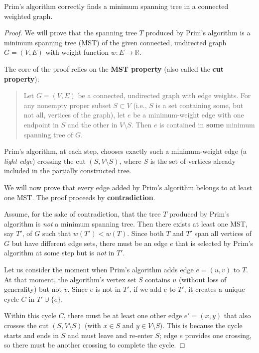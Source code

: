 \begin{theorem}
Prim's algorithm correctly finds a minimum spanning tree in a connected weighted graph.
\end{theorem}

\begin{proof}
We will prove that the spanning tree $T$ produced by Prim's algorithm is a minimum spanning tree (MST) of the given connected, undirected graph $G=(V,E)$ with weight function $w: E \rightarrow \mathbb{R}$.

The core of the proof relies on the \textbf{MST property} (also called the \textbf{cut property}):
\begin{quote}
Let $G=(V,E)$ be a connected, undirected graph with edge weights. For any nonempty proper subset $S \subset V$ (i.e., $S$ is a set containing some, but not all, vertices of the graph), let $e$ be a minimum-weight edge with one endpoint in $S$ and the other in $V \setminus S$. Then $e$ is contained in \textbf{some} minimum spanning tree of $G$.
\end{quote}
Prim's algorithm, at each step, chooses exactly such a minimum-weight edge (a \emph{light edge}) crossing the cut $(S, V \setminus S)$, where $S$ is the set of vertices already included in the partially constructed tree.

We will now prove that every edge added by Prim's algorithm belongs to at least one MST. The proof proceeds by \textbf{contradiction}.

Assume, for the sake of contradiction, that the tree $T$ produced by Prim's algorithm is \emph{not} a minimum spanning tree. Then there exists at least one MST, say $T'$, of $G$ such that $w(T') < w(T)$. Since both $T$ and $T'$ span all vertices of $G$ but have different edge sets, there must be an edge $e$ that is selected by Prim's algorithm at some step but is \emph{not} in $T'$.

Let us consider the moment when Prim's algorithm adds edge $e = (u,v)$ to $T$. At that moment, the algorithm's vertex set $S$ contains $u$ (without loss of generality) but not $v$. Since $e$ is not in $T'$, if we add $e$ to $T'$, it creates a unique cycle $C$ in $T' \cup \{e\}$.

Within this cycle $C$, there must be at least one other edge $e' = (x,y)$ that also crosses the cut $(S, V \setminus S)$ (with $x \in S$ and $y \in V \setminus S$). This is because the cycle starts and ends in $S$ and must leave and re-enter $S$; edge $e$ provides one crossing, so there must be another crossing to complete the cycle.


\end{proof}

